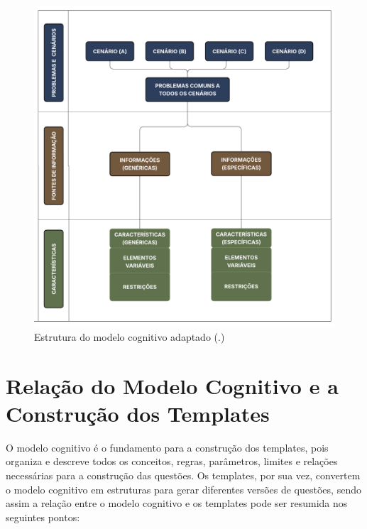 \begin{figure}[ht]
	\centering
	\includegraphics[width=16cm]{./imagens/capitulo4/cognitive-model}
	\caption{Estrutura do modelo cognitivo adaptado (\cite[p. 33]{gierl2021}.)}
	\label{fig:cognitive-model}
\end{figure}


\section{Relação do Modelo Cognitivo e a Construção dos Templates }

O modelo cognitivo é o fundamento para a construção dos templates, pois organiza e descreve todos os conceitos, regras, parâmetros, limites e relações necessárias para a construção das questões. Os templates, por sua vez, convertem o modelo cognitivo em estruturas para gerar diferentes versões de questões, sendo assim a relação entre o modelo cognitivo e os templates pode ser resumida nos seguintes pontos:


